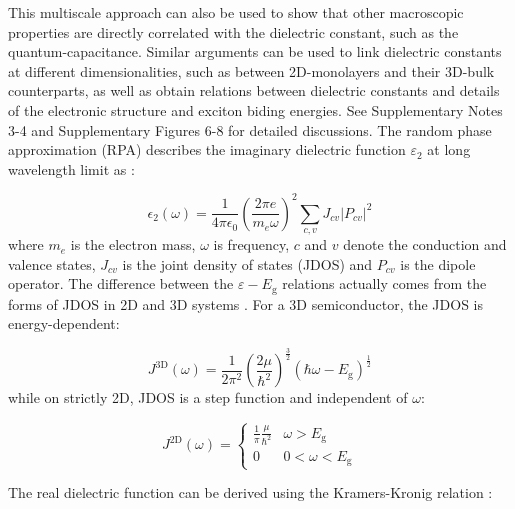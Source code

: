 \documentclass[journal=ancac3,manuscript=article,email=true,hyperref=true,keywords=true]{achemso}
\begin{document}
This multiscale approach can also be used to show that other macroscopic properties are directly
correlated with the dielectric constant, such as the quantum-capacitance. 
Similar arguments can be used to link dielectric constants at different dimensionalities, such as between 2D-monolayers and their 3D-bulk counterparts, as well as obtain relations between dielectric constants and details of the electronic structure and exciton biding energies. See Supplementary Notes 3-4 and Supplementary Figures 6-8 for detailed discussions.
The random phase approximation (RPA) describes the imaginary dielectric function \(\varepsilon_{2}\)
at long wavelength limit as \cite{Slyom_2008_fundBook,Dressel:2002aa}:

\begin{equation}
\label{eq:RPA-eps2}
\epsilon_{2}(\omega) = \frac{1}{4 \pi \epsilon_0} (\frac{2\pi e}{m_{e} \omega})^{2} \sum_{c, v} J_{cv}|P_{cv}|^{2}
\end{equation}
where $m_e$ is the electron mass, \(\omega\) is frequency, \(c\) and \(v\)
denote the conduction and valence states, \(J_{cv}\) is the joint density
of states (JDOS) and $P_{cv}$ is the dipole operator. The
difference between the \(\varepsilon-E_{\mathrm{g}}\) relations actually
comes from the forms of JDOS in 2D and 3D systems \cite{Ha_2011_introductry}. 
For a 3D semiconductor, the JDOS is energy-dependent:

\begin{equation}
\label{eq:JDOS-3D}
J^{\mathrm{3D}}(\omega) = \frac{1}{2\pi^{2}} (\frac{2 \mu}{ \hbar ^{2}})^{\frac{3}{2}}
                        (\hbar \omega - E_{\mathrm{g}})^{\frac{1}{2}}
\end{equation}
while on strictly 2D, JDOS is a step function and independent of \(\omega\):

\begin{equation}
\label{eq:JDOS-2D}
J^{\mathrm{2D}}(\omega) = 
                        \begin{cases}
                        \displaystyle \frac{1}{\pi} \frac{\mu}{\hbar^{2}} & \omega > E_{\mathrm{g}} \\
                        0                                   & 0 < \omega < E_{\mathrm{g}}
                        \end{cases}
\end{equation}

The real dielectric function can be derived using the Kramers-Kronig
relation \cite{Adachi_1987_dielGaP}:
\end{document}
